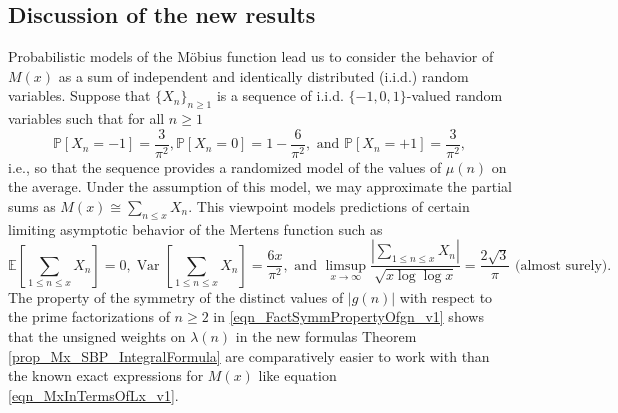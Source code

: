 \documentclass[11pt,reqno,a4letter]{article}
\newcommand{\hlocalref}[1]{\hyperref[#1]{\ref{#1}}}
\numberwithin{equation}{section}
\numberwithin{figure}{section}
\numberwithin{table}{section}
\theoremstyle{plain}
\numberwithin{theorem}{section}
\theoremstyle{definition}
\begin{document}
\subsection{Discussion of the new results}

Probabilistic models of the M\"obius function lead us to consider the behavior of $M(x)$ 
as a sum of independent and identically distributed (i.i.d.) random variables. 
Suppose that $\{X_n\}_{n \geq 1}$ is a sequence of i.i.d. 
$\{-1,0,1\}$-valued random variables 
such that for all $n \geq 1$ 
$$\mathbb{P}[X_n = -1] = \frac{3}{\pi^2}, \mathbb{P}[X_n = 0] = 1 - \frac{6}{\pi^2}, \text{ and }  
  \mathbb{P}[X_n = +1] = \frac{3}{\pi^2},$$ 
i.e., so that the sequence provides a randomized model of the values of $\mu(n)$ on the average. 
Under the assumption of this model, we may approximate the partial sums as 
$M(x) \cong \sum_{n \leq x} X_n$. 
This viewpoint models predictions of certain limiting asymptotic behavior of the 
Mertens function such as 
\[
\mathbb{E}\left[\sum_{1 \leq n \leq x} X_n\right] = 0, 
     \operatorname{Var}\left[\sum_{1 \leq n \leq x} X_n\right] = \frac{6x}{\pi^2}, 
     \text{ and } 
     \limsup_{x \rightarrow \infty} \frac{\left\lvert \sum\limits_{1 \leq n \leq x} X_n 
     \right\rvert}{\sqrt{x \log\log x}} = \frac{2\sqrt{3}}{\pi}
     \text{ (almost surely).} 
\]
The property of the symmetry of the distinct values of $|g(n)|$ with respect to the 
prime factorizations of $n \geq 2$ in \eqref{eqn_FactSymmPropertyOfgn_v1} 
shows that the unsigned weights on $\lambda(n)$ in 
the new formulas Theorem \hlocalref{prop_Mx_SBP_IntegralFormula} 
are comparatively easier to work with than the known 
exact expressions for $M(x)$ like equation \eqref{eqn_MxInTermsOfLx_v1}. 
\end{document}
